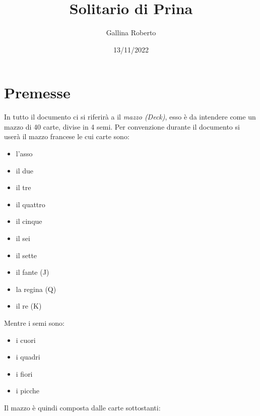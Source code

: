 \documentclass[a4paper]{article}
\begin{document}
\begin{titlepage}
    \title{Solitario di Prina}
    \author{Gallina Roberto}
    \date{13/11/2022}
    \maketitle
\end{titlepage}

\newpage

\tableofcontents

\newpage

\section{Premesse}
In tutto il documento ci si riferirà a il \emph{mazzo (Deck)}, esso è da intendere come un mazzo di 40 carte, divise in 4 semi. Per convenzione durante il documento si userà il mazzo francese le cui carte sono:

\begin{itemize}
    \item l'asso
    \item il due
    \item il tre
    \item il quattro
    \item il cinque
    \item il sei
    \item il sette
    \item il fante (J)
    \item la regina (Q)
    \item il re (K)
\end{itemize}

\noindent
Mentre i semi sono:

\begin{itemize}
    \item i cuori
    \item i quadri
    \item i fiori
    \item i picche
\end{itemize}

\noindent
Il mazzo è quindi composta dalle carte sottostanti:
\end{document}
